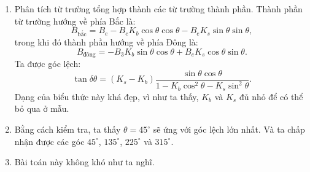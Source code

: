 \begin{loigiai}
\begin{enumerate}[1)]
    \item Phân tích từ trường tổng hợp thành các từ trường thành phần. Thành phần từ trường hướng về phía Bắc là:
$$B_{\text{bắc}}=B_e-B_eK_b\cos\theta\cos\theta-B_eK_s\sin\theta\sin\theta,$$
trong khi đó thành phần hướng về phía Đông là:
$$B_{\text{đông}}=-B_3K_b\sin\theta\cos\theta+B_eK_s\cos\theta\sin\theta.$$
Ta được góc lệch:
$$ \tan \delta \theta=\left(K_{s}-K_{b}\right) \dfrac{\sin \theta \cos \theta}{1-K_{b} \cos ^{2} \theta-K_{s} \sin ^{2} \theta}.$$
Dạng của biểu thức này khá đẹp, vì như ta thấy, $K_b$ và $K_s$ đủ nhỏ để có thể bỏ qua ở mẫu.
    \item Bằng cách kiểm tra, ta thấy $\theta=45^\circ$ sẽ ứng với góc lệch lớn nhất. Và ta chấp nhận được các góc $45^\circ$, $135^\circ$, $225^\circ$ và $315^\circ$.
    \item Bài toán này không khó như ta nghĩ.\\
    \begin{center}
        


\begin{tikzpicture}[x=0.75pt,y=0.75pt,yscale=-1,xscale=1]


\end{tikzpicture}
\end{center}
\end{enumerate}
\end{loigiai}
